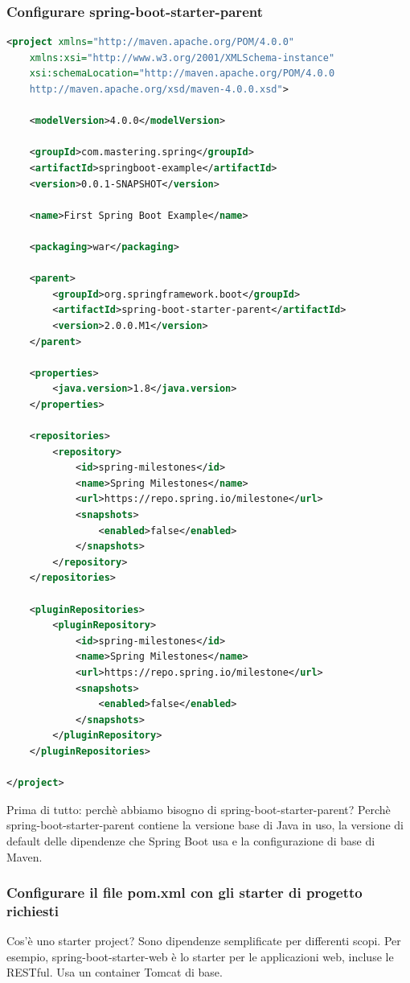 \documentclass[11pt,a4paper]{book}
\begin{document}
\subsubsection{Configurare spring-boot-starter-parent}
\begin{lstlisting}[language = XML]
<project xmlns="http://maven.apache.org/POM/4.0.0"
	xmlns:xsi="http://www.w3.org/2001/XMLSchema-instance"
	xsi:schemaLocation="http://maven.apache.org/POM/4.0.0
	http://maven.apache.org/xsd/maven-4.0.0.xsd">
	
	<modelVersion>4.0.0</modelVersion>
	
	<groupId>com.mastering.spring</groupId>
	<artifactId>springboot-example</artifactId>
	<version>0.0.1-SNAPSHOT</version>
	
	<name>First Spring Boot Example</name>
	
	<packaging>war</packaging>
	
	<parent>
		<groupId>org.springframework.boot</groupId>
		<artifactId>spring-boot-starter-parent</artifactId>
		<version>2.0.0.M1</version>
	</parent>
	
	<properties>
		<java.version>1.8</java.version>
	</properties>
	
	<repositories>
		<repository>
			<id>spring-milestones</id>
			<name>Spring Milestones</name>
			<url>https://repo.spring.io/milestone</url>
			<snapshots>
				<enabled>false</enabled>
			</snapshots>
		</repository>
	</repositories>

	<pluginRepositories>
		<pluginRepository>
			<id>spring-milestones</id>
			<name>Spring Milestones</name>
			<url>https://repo.spring.io/milestone</url>
			<snapshots>
				<enabled>false</enabled>
			</snapshots>
		</pluginRepository>
	</pluginRepositories>
	
</project>
\end{lstlisting}
Prima di tutto: perchè abbiamo bisogno di spring-boot-starter-parent? Perchè spring-boot-starter-parent contiene la versione base di Java in uso, la versione di default delle dipendenze che Spring Boot usa e la configurazione di base di Maven.

\subsubsection{Configurare il file pom.xml con gli starter di progetto richiesti}
Cos'è uno starter project? Sono dipendenze semplificate per differenti scopi. Per esempio, spring-boot-starter-web è lo starter per le applicazioni web, incluse le RESTful. Usa un container Tomcat di base.
\end{document}
